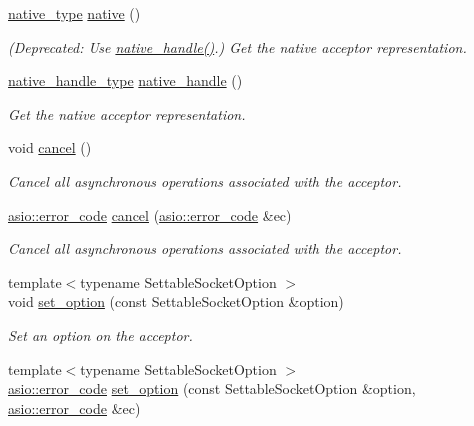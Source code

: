 \begin{DoxyCompactItemize}
\hyperlink{classasio_1_1basic__socket__acceptor_a816fd87f40cd81374fa6b0c66e11006c}{native\+\_\+type} \hyperlink{classasio_1_1basic__socket__acceptor_a6765e5952ac2c22ae8cc21af84e1e4cf}{native} ()
\begin{DoxyCompactList}\small\item\em (Deprecated\+: Use \hyperlink{classasio_1_1basic__socket__acceptor_af68f4b40844f6ce2b95f9775dec0ab7d}{native\+\_\+handle()}.) Get the native acceptor representation. \end{DoxyCompactList}\item 
\hyperlink{classasio_1_1basic__socket__acceptor_a6b3afaaad5c55272803ad5b911a00d35}{native\+\_\+handle\+\_\+type} \hyperlink{classasio_1_1basic__socket__acceptor_af68f4b40844f6ce2b95f9775dec0ab7d}{native\+\_\+handle} ()
\begin{DoxyCompactList}\small\item\em Get the native acceptor representation. \end{DoxyCompactList}\item 
void \hyperlink{classasio_1_1basic__socket__acceptor_a24e4ffda1c79c425f407bb5f749f4d16}{cancel} ()
\begin{DoxyCompactList}\small\item\em Cancel all asynchronous operations associated with the acceptor. \end{DoxyCompactList}\item 
\hyperlink{classasio_1_1error__code}{asio\+::error\+\_\+code} \hyperlink{classasio_1_1basic__socket__acceptor_a093c764ab49404ff2d26c9e25935e183}{cancel} (\hyperlink{classasio_1_1error__code}{asio\+::error\+\_\+code} \&ec)
\begin{DoxyCompactList}\small\item\em Cancel all asynchronous operations associated with the acceptor. \end{DoxyCompactList}\item 
{\footnotesize template$<$typename Settable\+Socket\+Option $>$ }\\void \hyperlink{classasio_1_1basic__socket__acceptor_af1b07dfb8f57f1dc32cba7c6ac8d27b6}{set\+\_\+option} (const Settable\+Socket\+Option \&option)
\begin{DoxyCompactList}\small\item\em Set an option on the acceptor. \end{DoxyCompactList}\item 
{\footnotesize template$<$typename Settable\+Socket\+Option $>$ }\\\hyperlink{classasio_1_1error__code}{asio\+::error\+\_\+code} \hyperlink{classasio_1_1basic__socket__acceptor_a615c6153ce062a143e374c429c502402}{set\+\_\+option} (const Settable\+Socket\+Option \&option, \hyperlink{classasio_1_1error__code}{asio\+::error\+\_\+code} \&ec)

\end{DoxyCompactItemize}
